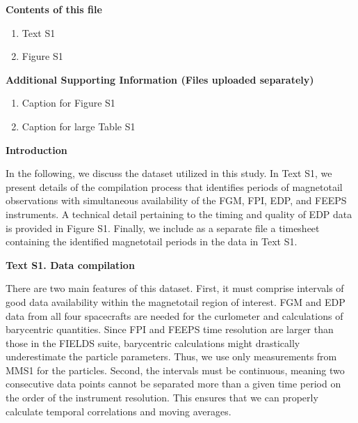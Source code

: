 \documentclass[draft,jgrga]{agutexSI2019}
\begin{document}
\begin{article}

\noindent\textbf{Contents of this file}
\begin{enumerate}
\item Text S1
\item Figure S1
\end{enumerate}
\noindent\textbf{Additional Supporting Information (Files uploaded separately)}
\begin{enumerate}
\item Caption for Figure S1
\item Caption for large Table S1
\end{enumerate}

\noindent\textbf{Introduction}

In the following, we discuss the dataset utilized in this study. In Text S1, we present details of the compilation process that identifies periods of magnetotail observations with simultaneous availability of the FGM, FPI, EDP, and FEEPS instruments. A technical detail pertaining to the timing and quality of EDP data is provided in Figure S1. Finally, we include as a separate file a timesheet containing the identified magnetotail periods in the data in Text S1. 


\noindent\textbf{Text S1. Data compilation}

There are two main features of this dataset. First, it must comprise intervals of good data availability within the magnetotail region of interest. FGM and EDP data from all four spacecrafts are needed for the curlometer and calculations of barycentric quantities. Since FPI and FEEPS time resolution are larger than those in the FIELDS suite, barycentric calculations might drastically underestimate the particle parameters. Thus, we use only measurements from MMS1 for the particles. Second, the intervals must be continuous, meaning two consecutive data points cannot be separated more than a given time period on the order of the instrument resolution. This ensures that we can properly calculate temporal correlations and moving averages.


\end{article}
\end{document}
